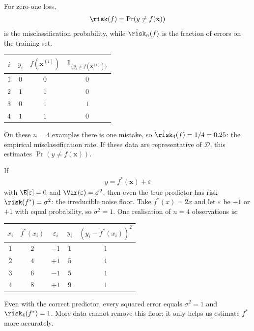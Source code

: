 \documentclass[a4paper, 12pt]{book}
\begin{document}
\begin{example}
    For zero-one loss, 
    \begin{align}
        \risk(f)=\Pr(y\neq f(\mathbf{x}))
    \end{align}
    is the misclassification probability, while $\hat\risk_n(f)$ is the fraction of errors on the training set.
    \begin{center}
    \begin{tabular}{@{}cccc@{}}
        \toprule
        $i$ & $y_i$ & $f(\mathbf{x}^{(i)})$ & $\mathbf{1}_{\{y_i\neq f(\mathbf{x}^{(i)})\}}$ \\
        \midrule
        $1$ & $0$ & $0$ & $0$ \\
        $2$ & $1$ & $1$ & $0$ \\
        $3$ & $0$ & $1$ & $1$ \\
        $4$ & $1$ & $1$ & $0$ \\
        \bottomrule
    \end{tabular}
    \end{center}
    On these $n=4$ examples there is one mistake, so
    $\hat\risk_4(f)=1/4=0.25$: the empirical misclassification rate. If these
    data are representative of $\mathscr{D}$, this estimates
    $\Pr(y\neq f(\mathbf{x}))$.
\end{example}

\begin{example}
    If 
    \begin{align}
        y=f^*(\mathbf{x})+\varepsilon
    \end{align}
    with $\E[\varepsilon]=0$ and $\Var(\varepsilon)=\sigma^2$, then even the true predictor has risk $\risk(f^*)=\sigma^2$: the irreducible noise floor.
    Take $f^*(x)=2x$ and let $\varepsilon$ be $-1$ or $+1$ with equal
    probability, so $\sigma^2=1$. One realisation of $n=4$ observations is:
    \begin{center}
    \begin{tabular}{@{}ccccc@{}}
        \toprule
        $x_i$ & $f^*(x_i)$ & $\varepsilon_i$ & $y_i$ & $(y_i-f^*(x_i))^2$ \\
        \midrule
        $1$ & $2$ & $-1$ & $1$ & $1$ \\
        $2$ & $4$ & $+1$ & $5$ & $1$ \\
        $3$ & $6$ & $-1$ & $5$ & $1$ \\
        $4$ & $8$ & $+1$ & $9$ & $1$ \\
        \bottomrule
    \end{tabular}
    \end{center}
    Even with the correct predictor, every squared error equals $\sigma^2=1$ and
    $\hat\risk_4(f^*)=1$. More data cannot remove this floor; it only helps us
    estimate $f^*$ more accurately.
\end{example}
\end{document}
